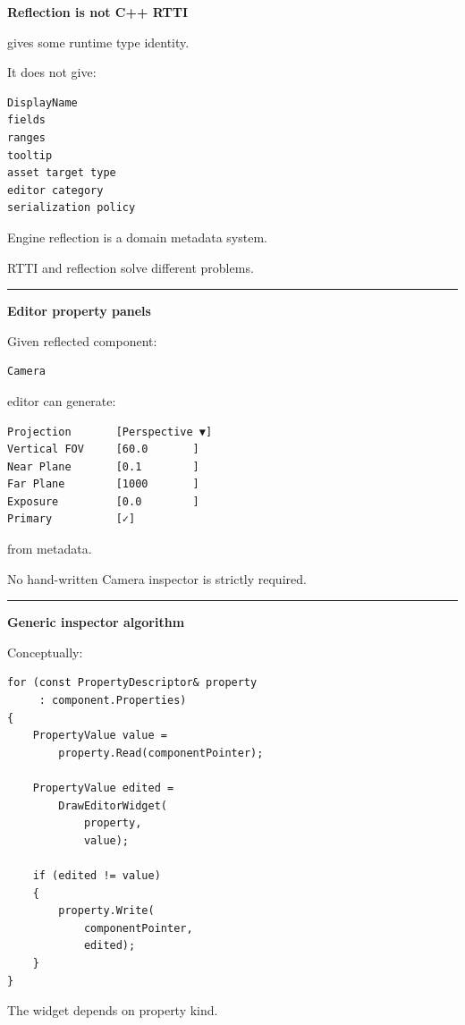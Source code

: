 \textbf{Reflection is not C++ RTTI}

 gives some runtime type identity.

It does not give:

\begin{verbatim}
DisplayName
fields
ranges
tooltip
asset target type
editor category
serialization policy
\end{verbatim}

Engine reflection is a domain metadata system.

RTTI and reflection solve different problems.

\begin{center}\rule{0.5\linewidth}{0.5pt}\end{center}

\textbf{Editor property panels}

Given reflected component:

\begin{verbatim}
Camera
\end{verbatim}

editor can generate:

\begin{verbatim}
Projection       [Perspective ▼]
Vertical FOV     [60.0       ]
Near Plane       [0.1        ]
Far Plane        [1000       ]
Exposure         [0.0        ]
Primary          [✓]
\end{verbatim}

from metadata.

No hand-written Camera inspector is strictly required.

\begin{center}\rule{0.5\linewidth}{0.5pt}\end{center}

\textbf{Generic inspector algorithm}

Conceptually:

\begin{verbatim}
for (const PropertyDescriptor& property
     : component.Properties)
{
    PropertyValue value =
        property.Read(componentPointer);

    PropertyValue edited =
        DrawEditorWidget(
            property,
            value);

    if (edited != value)
    {
        property.Write(
            componentPointer,
            edited);
    }
}
\end{verbatim}

The widget depends on property kind.

